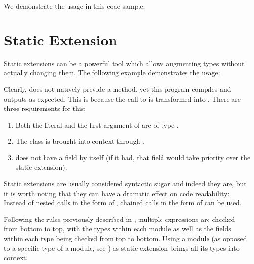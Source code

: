 We demonstrate the usage in this code sample:



\section{Static Extension}
\label{lf-static-extension}


Static extensions can be a powerful tool which allows augmenting types without actually changing them. The following example demonstrates the usage:


Clearly,  does not natively provide a  method, yet this program compiles and outputs  as expected. This is because the call to  is transformed into . There are three requirements for this:

\begin{enumerate}
	\item Both the literal  and the first argument of  are of type .
	\item The class  is brought into context through .
	\item {} does not have a  field by itself (if it had, that field would take priority over the static extension).
\end{enumerate}

Static extensions are usually considered syntactic sugar and indeed they are, but it is worth noting that they can have a dramatic effect on code readability: Instead of nested calls in the form of , chained calls in the form of  can be used.

Following the rules previously described in , multiple  expressions are checked from bottom to top, with the types within each module as well as the fields within each type being checked from top to bottom. Using a module (as opposed to a specific type of a module, see ) as static extension brings all its types into context.

